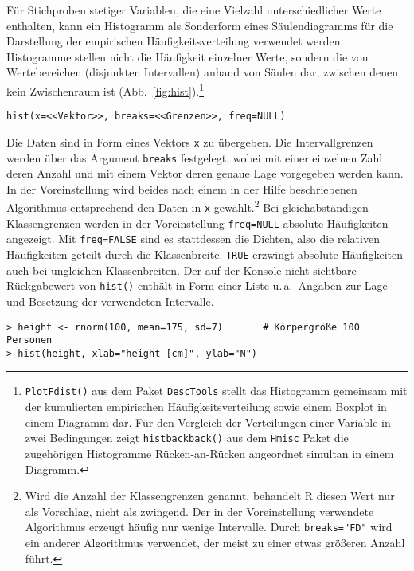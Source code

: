 Für Stichproben stetiger Variablen, die eine Vielzahl unterschiedlicher Werte enthalten, kann ein Histogramm als Sonderform eines Säulendiagramms für die Darstellung der empirischen Häufigkeitsverteilung verwendet werden. Histogramme stellen nicht die Häufigkeit einzelner Werte, sondern die von Wertebereichen (disjunkten Intervallen) anhand von Säulen dar, zwischen denen kein Zwischenraum ist (Abb.\ \ref{fig:hist}).\footnote{\lstinline!PlotFdist()! aus dem Paket \lstinline!DescTools! stellt das Histogramm gemeinsam mit der kumulierten empirischen Häufigkeitsverteilung sowie einem Boxplot in einem Diagramm dar. Für den Vergleich der Verteilungen einer Variable in zwei Bedingungen zeigt \lstinline!histbackback()! aus dem \lstinline!Hmisc! Paket die zugehörigen Histogramme Rücken-an-Rücken angeordnet simultan in einem Diagramm.}
\begin{lstlisting}
hist(x=<<Vektor>>, breaks=<<Grenzen>>, freq=NULL)
\end{lstlisting}

Die Daten sind in Form eines Vektors \lstinline!x! zu übergeben. Die Intervallgrenzen werden über das Argument \lstinline!breaks! festgelegt, wobei mit einer einzelnen Zahl deren Anzahl und mit einem Vektor deren genaue Lage vorgegeben werden kann. In der Voreinstellung wird beides nach einem in der Hilfe beschriebenen Algorithmus entsprechend den Daten in \lstinline!x! gewählt.\footnote{Wird die Anzahl der Klassengrenzen genannt, behandelt R diesen Wert nur als Vorschlag, nicht als zwingend. Der in der Voreinstellung verwendete Algorithmus erzeugt häufig nur wenige Intervalle. Durch \lstinline!breaks="FD"! wird ein anderer Algorithmus verwendet, der meist zu einer etwas größeren Anzahl führt.} Bei gleichabständigen Klassengrenzen werden in der Voreinstellung \lstinline!freq=NULL! absolute Häufigkeiten angezeigt. Mit \lstinline!freq=FALSE! sind es stattdessen die Dichten, also die relativen Häufigkeiten geteilt durch die Klassenbreite. \lstinline!TRUE! erzwingt absolute Häufigkeiten auch bei ungleichen Klassenbreiten. Der auf der Konsole nicht sichtbare Rückgabewert von \lstinline!hist()! enthält in Form einer Liste u.\,a.\ Angaben zur Lage und Besetzung der verwendeten Intervalle.
\begin{lstlisting}
> height <- rnorm(100, mean=175, sd=7)       # Körpergröße 100 Personen
> hist(height, xlab="height [cm]", ylab="N")
\end{lstlisting}

